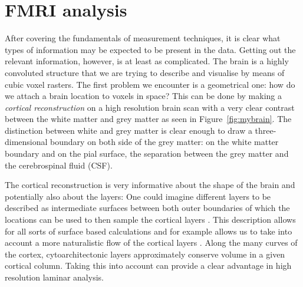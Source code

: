 \section*{FMRI analysis}
After covering the fundamentals of measurement techniques, it is clear what types of information may be expected to be present in the data. Getting out the relevant information, however, is at least as complicated. The brain is a highly convoluted structure that we are trying to describe and visualise by means of cubic voxel rasters. The first problem we encounter is a geometrical one: how do we attach a brain location to voxels in space? This can be done by making a \emph{cortical reconstruction} on a high resolution brain scan \cite{Dale1999,Bazin2012} with a very clear contrast between the white matter and grey matter as seen in Figure~\ref{fig:mybrain}. The distinction between white and grey matter is clear enough to draw a three-dimensional boundary on both side of the grey matter: on the white matter boundary and on the pial surface, the separation between the grey matter and the cerebrospinal fluid (CSF).

The cortical reconstruction is very informative about the shape of the brain and potentially also about the layers: One could imagine different layers to be described as intermediate surfaces between both outer boundaries of which the locations can be used to then sample the cortical layers \cite{Koopmans2011,Polimeni2010,DeMartino2013}. This description allows for all sorts of surface based calculations \cite{Fischl2000,Bazin2012} and for example allows us to take into account a more naturalistic flow of the cortical layers \cite{Bok1929,Waehnert2014}. Along the many curves of the cortex, cytoarchitectonic layers approximately conserve volume in a given cortical column. Taking this into account can provide a clear advantage in high resolution laminar analysis.

